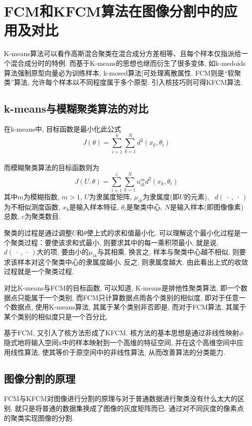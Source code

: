 \documentclass[lang=cn,11pt]{elegantpaper}
\begin{document}
\section{FCM和KFCM算法在图像分割中的应用及对比}

K-means算法可以看作高斯混合聚类在混合成分方差相等、且每个样本仅指派给一个混合成分时的特例. 而基于K-means的思想也继而衍生了很多变体, 如k-medoids算法\cite{RousseeuwPrincipal}强制原型向量必为训练样本, k-mosed算法[\cite{JingPalladium}可处理离散属性. FCM\cite{Bezdek1981Pattern}则是“软聚类”算法, 允许每个样本以不同程度属于多个原型. 引入核技巧则可得KFCM算法. 
\subsection{k-means与模糊聚类算法的对比}
在k-means中, 目标函数是最小化此公式
\begin{equation*}
J(\theta)=\sum_{i=1}^k\sum_{k=1}^N d^2(x_k,\theta_i)
\end{equation*}
\\而模糊聚类算法的目标函数则为
\begin{equation*}
	J(U,\theta)=\sum_{i=1}^c\sum_{k=1}^Nu_{ik}^m d^2(x_k,\theta_i)
\end{equation*}
其中$m$为模糊指数, $m>1$, $U$为隶属度矩阵, $\mu_{ik}$为隶属度(即$U$的元素), 
\ $d(\ \cdot \ , \ \cdot \ )$为不相似测度函数, $x_k$是输入样本特征, $\theta_i$是聚类中心, $N$是输入样本(即图像像素)总数, $c$为聚类数目. 
\par 聚类的过程是通过调整$U$和$\theta$使上式的求和值最小化. 可以理解这个最小化过程是一个聚类过程：要使该求和式最小, 则要求其中的每一乘积项最小, 就是说, $d(\ \cdot \ , \ \cdot \ )$大的项, 要由小的$\mu_{ik}$与其相乘. 换言之, 样本与聚类中心越不相似, 则要求该样本对这个聚类中心的隶属度越小, 反之, 则隶属度越大. 由此看出上式的收敛过程就是一个聚类过程. 
\par 对比K-means与FCM的目标函数, 可以知道, K-means是排他性聚类算法, 即一个数据点只能属于一个类别, 而FCM只计算数据点雨各个类别的相似度, 即对于任意一个数据点, 使用K-means算法, 其属于某个类别非否即是, 而对于FCM算法, 其属于某个类别的相似度只是一个百分比. 

基于FCM, 又引入了核方法形成了KFCM. 核方法的基本思想是通过非线性映射$\phi$隐式地将输入空间x中的样本映射到一个高维的特征空间, 并在这个高维空间中应用线性算法, 使其等价于原空间中的非线性算法, 从而改善算法的分类能力. 
\subsection{图像分割的原理}
FCM与KFCM对图像进行分割的原理与对于普通数据进行聚类没有什么太大的区别, 就只是将普通的数据集换成了图像的灰度矩阵而已. 通过对不同灰度的像素点的聚类实现图像的分割. 
\end{document}
